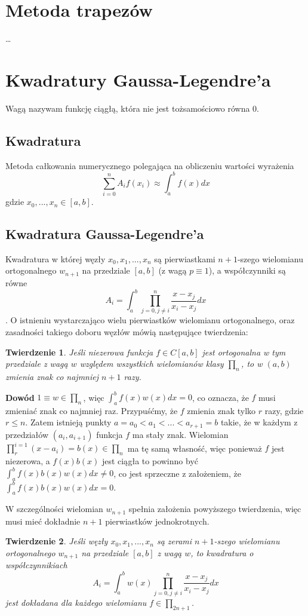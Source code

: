 \documentclass{article}
\newtheorem{theorem}{Twierdzenie}
\begin{document}
\section*{Metoda trapezów}
\dots
\section*{Kwadratury Gaussa-Legendre'a}
	Wagą nazywam funkcję ciągłą, która nie jest tożsamościowo równa 0.
\subsection*{Kwadratura} 
Metoda całkowania numerycznego polegająca na obliczeniu wartości wyrażenia
\[ \sum_{i=0}^n A_if(x_i) \approx \int_a^b f(x) d x \] 
gdzie $x_0,...,x_n\in [a,b]$.

\subsection*{Kwadratura Gaussa-Legendre'a}
Kwadratura w której węzły $x_0,x_1,...,x_n$ są pierwiastkami $n+1$-szego
wielomianu ortogonalnego $w_{n+1}$ na przedziale $[a,b]$ (z wagą $p\equiv 1$), a współczynniki są równe
\[A_i=\int_a^b \prod_{j=0,j\neq i}^n \frac{x-x_j}{x_i-x_j} dx\]. O istnieniu
wystarczająco wielu pierwiastków wielomianu ortogonalnego, oraz zasadności 
takiego doboru węzłów mówią następujące twierdzenia: 
\begin{theorem}
	Jeśli niezerowa funkcja $f\in C[a,b]$ jest ortogonalna w tym przedziale z wagą $w$ względem wszystkich wielomianów klasy $\prod_{n}$, to w $(a,b)$ zmienia znak co najmniej $n+1$ razy.
\end{theorem}
\textbf{Dowód} $1\equiv w \in \prod_{n}$, więc $\int_a^b f(x)w(x)dx = 0$, co oznacza, że $f$ musi zmieniać znak co najmniej raz. Przypuśćmy, że $f$ zmienia znak tylko $r$ razy, gdzie $r\le n $. Zatem istnieją punkty $a=a_0<a_1<...<a_{r+1}=b$ takie, że w każdym z przedziałów $(a_i,a_{i+1})$ funkcja $f$ ma stały znak. Wielomian $\prod_{r}^{i=1}(x-a_i) = b(x) \in \prod_{n}$ ma tę samą własność, więc ponieważ $f$ jest niezerowa, a $f(x)b(x)$ jest ciągła to powinno być $\int_{a}^{b} f(x)b(x)w(x)dx\neq 0$, co jest sprzeczne z założeniem, że $\int_{a}^{b}f(x)b(x)w(x)dx = 0$. \newline

W szczególności wielomian $w_{n+1}$ spełnia założenia powyższego twierdzenia, więc musi mieć dokładnie $n+1$ pierwiastków jednokrotnych.

\begin{theorem}
	Jeśli węzły $x_0,x_1,...,x_n$ są zerami $n+1$-szego wielomianu ortogonalnego $w_{n+1}$ na przedziale $[a,b]$ z wagą $w$, to kwadratura o współczynnikiach
	\[A_i=\int_a^b w(x)\prod_{j=0,j\neq i}^n \frac{x-x_j}{x_i-x_j} dx\] jest dokładana dla każdego wielomianu $f\in\prod_{2n+1}$.
\end{theorem}
\end{document}
